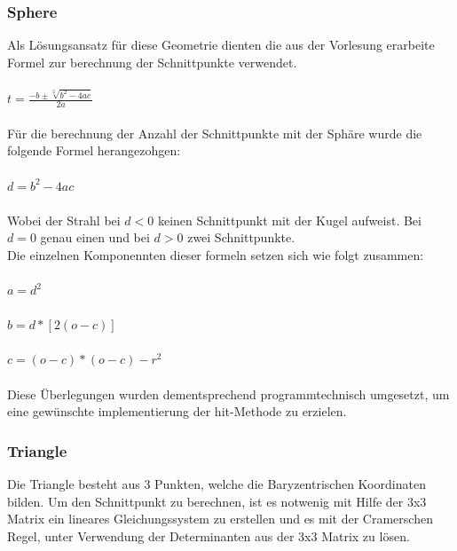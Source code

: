\documentclass[14pt]{extarticle}
\begin{document}
\subsubsection{Sphere}
Als Lösungsansatz für diese Geometrie dienten die aus der Vorlesung erarbeite Formel zur berechnung der Schnittpunkte verwendet.
\\\\\begin{math} t=\frac{-b\pm \sqrt[2]{b^2-4ac}}{2a}\end{math}\\\\
Für die berechnung der Anzahl der Schnittpunkte mit der Sphäre wurde die folgende Formel herangezohgen:
\\\\\begin{math} d=b^2-4ac\end{math}\\\\
Wobei der Strahl bei \begin{math}d < 0\end{math} keinen Schnittpunkt mit der Kugel aufweist. Bei \begin{math}d = 0\end{math} genau einen und bei \begin{math}d > 0\end{math} zwei Schnittpunkte.\\
Die einzelnen Komponennten dieser formeln setzen sich wie folgt zusammen:\\\\
\begin{math}a=d^2\end{math}\\\\
\begin{math}b=d*[2(o-c)]\end{math}\\\\
\begin{math}c=(o-c)*(o-c)-r^2\end{math}\\\\

Diese Überlegungen wurden dementsprechend programmtechnisch umgesetzt, um eine gewünschte implementierung der hit-Methode zu erzielen.
 

\subsubsection{Triangle}
Die Triangle besteht aus 3 Punkten, welche die Baryzentrischen Koordinaten bilden. Um den Schnittpunkt zu berechnen, ist es notwenig mit Hilfe der 3x3 Matrix ein lineares Gleichungssystem zu erstellen und es mit der Cramerschen Regel, unter Verwendung der Determinanten aus der 3x3 Matrix zu lösen.
\end{document}
